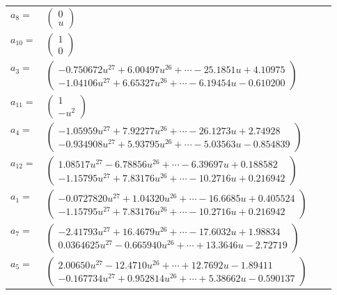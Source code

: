 \documentclass[1p]{elsarticle_modified}
\theoremstyle{definition}
\begin{document}
\begin{tabular}{m{7pt} m{180pt} m{7pt} m{180pt} }
\flushright $a_{8}=$&$\begin{pmatrix}0\\u\end{pmatrix}$ \\
\flushright $a_{10}=$&$\begin{pmatrix}1\\0\end{pmatrix}$ \\
\flushright $a_{3}=$&$\begin{pmatrix}-0.750672 u^{27}+6.00497 u^{26}+\cdots-25.1851 u+4.10975\\-1.04106 u^{27}+6.65327 u^{26}+\cdots-6.19454 u-0.610200\end{pmatrix}$ \\
\flushright $a_{11}=$&$\begin{pmatrix}1\\- u^2\end{pmatrix}$ \\
\flushright $a_{4}=$&$\begin{pmatrix}-1.05959 u^{27}+7.92277 u^{26}+\cdots-26.1273 u+2.74928\\-0.934908 u^{27}+5.93795 u^{26}+\cdots-5.03563 u-0.854839\end{pmatrix}$ \\
\flushright $a_{12}=$&$\begin{pmatrix}1.08517 u^{27}-6.78856 u^{26}+\cdots-6.39697 u+0.188582\\-1.15795 u^{27}+7.83176 u^{26}+\cdots-10.2716 u+0.216942\end{pmatrix}$ \\
\flushright $a_{1}=$&$\begin{pmatrix}-0.0727820 u^{27}+1.04320 u^{26}+\cdots-16.6685 u+0.405524\\-1.15795 u^{27}+7.83176 u^{26}+\cdots-10.2716 u+0.216942\end{pmatrix}$ \\
\flushright $a_{7}=$&$\begin{pmatrix}-2.41793 u^{27}+16.4679 u^{26}+\cdots-17.6032 u+1.98834\\0.0364625 u^{27}-0.665940 u^{26}+\cdots+13.3646 u-2.72719\end{pmatrix}$ \\
\flushright $a_{5}=$&$\begin{pmatrix}2.00650 u^{27}-12.4710 u^{26}+\cdots+12.7692 u-1.89411\\-0.167734 u^{27}+0.952814 u^{26}+\cdots+5.38662 u-0.590137\end{pmatrix}$ \\

\end{tabular}
\end{document}
